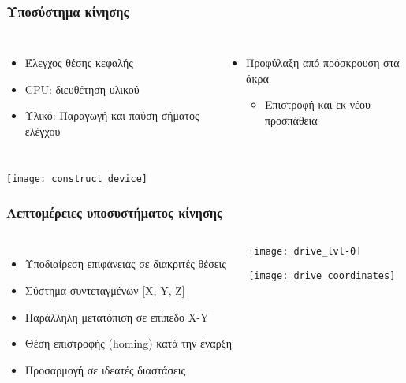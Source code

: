 \documentclass[xetex,mathserif,serif]{beamer}
\begin{document}
\begin{frame}\frametitle
    {Υποσύστημα κίνησης}

    \begin{columns}
    \column{5.5cm}
    \begin{itemize}
        \item Έλεγχος θέσης κεφαλής
        \item CPU: διευθέτηση υλικού
        \item Υλικό: Παραγωγή και παύση σήματος ελέγχου
    \end{itemize}

    \column{5.5cm}
    \begin{itemize}
        \item Προφύλαξη από πρόσκρουση στα άκρα
            \begin{itemize}
            \item Επιστροφή και εκ νέου προσπάθεια
            \end{itemize}
    \end{itemize}
    \end{columns}

    \begin{center}
    \texttt{[image: construct\_device]}
    \end{center}
\end{frame}


\begin{frame}\frametitle
    {Λεπτομέρειες υποσυστήματος κίνησης}

    \begin{columns}[T]
    \column{5cm}
    \begin{itemize}
    \item Υποδιαίρεση επιφάνειας σε διακριτές θέσεις
    \item Σύστημα συντεταγμένων [X, Y, Z]
    \item Παράλληλη μετατόπιση σε επίπεδο X-Y
    \item Θέση επιστροφής (homing) κατά την έναρξη
    \item Προσαρμογή σε ιδεατές διαστάσεις
    \end{itemize}

    \column{6cm}
    \begin{center}
    \texttt{[image: drive\_lvl-0]}

    \rule{0pt}{0.5cm}

    \texttt{[image: drive\_coordinates]}
    \end{center}
    \end{columns}
\end{frame}
\end{document}
